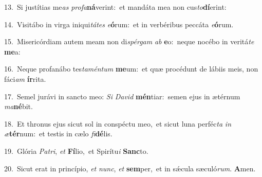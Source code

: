 {\numbfont\textcolor{\numbcolor}{13.}}~Si justítias me\textit{as} \textit{pro}\-\textit{fa}\textbf{ná}verint:~\star et mandáta mea non cus\-\textit{to}\-\textbf{dí}erint:\par
{\numbfont\textcolor{\numbcolor}{14.}}~Visitábo in virga iniqui\-\textit{tá}\-\textit{tes} \textit{e}\-\textbf{ó}rum:~\star et in verbéribus peccáta \textit{e}\-\textbf{ó}rum.\par
{\numbfont\textcolor{\numbcolor}{15.}}~Misericórdiam autem meam non di\-\textit{spér}\-\textit{gam} \textit{ab} \textbf{e}\-o:~\star neque nocébo in veritá\textit{te} \textbf{me}\-a:\par
{\numbfont\textcolor{\numbcolor}{16.}}~Neque profanábo tes\-\textit{ta}\-\textit{mén}\textit{tum} \textbf{me}\-um:~\star et quæ procédunt de lábiis meis, non fáci\textit{am} \textbf{ír}\-rita.\par
{\numbfont\textcolor{\numbcolor}{17.}}~Semel jurávi in sancto meo: \textit{Si} \textit{Da}\-\textit{vid} \textbf{mén}\-tiar:~\star semen ejus in ætérnum \textit{ma}\-\textbf{né}bit.\par
{\numbfont\textcolor{\numbcolor}{18.}}~Et thronus ejus sicut sol in conspéctu meo,~\dagger et sicut luna perféc\textit{ta} \textit{in} \textit{æ}\-\textbf{tér}num:~\star et testis in cælo \textit{fi}\-\textbf{dé}lis.\par
{\numbfont\textcolor{\numbcolor}{19.}}~Glória \textit{Pa}\-\textit{tri}, \textit{et} \textbf{Fí}\-lio,~\star et Spirítu\textit{i} \textbf{Sanc}\-to.\par
{\numbfont\textcolor{\numbcolor}{20.}}~Sicut erat in princípio, \textit{et} \textit{nunc}\-, \textit{et} \textbf{sem}\-per,~\star et in sǽcula sæculó\-\textit{rum}\-. \textbf{A}\-men.\par
